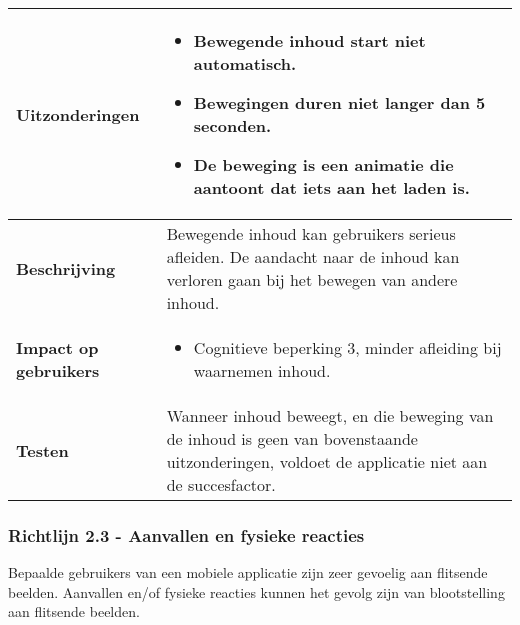 \begin{table}[H]
\begin{tabular}{|l|p{12cm}|}
        \hline
        \textbf{Uitzonderingen}     & 
        \begin{itemize}
            \item Bewegende inhoud start niet automatisch.
            \item Bewegingen duren niet langer dan 5 seconden.
            \item De beweging is een animatie die aantoont dat iets aan het laden is.
        \end{itemize}                                                                                                                                                                                                   \\ 
        \hline
        \textbf{Beschrijving}                 & Bewegende inhoud kan gebruikers serieus afleiden. De aandacht naar de inhoud kan verloren gaan bij het bewegen van andere inhoud. \\ 
        \hline
        \textbf{Impact op gebruikers}         &  
        \begin{itemize}
            \item Cognitieve beperking 3, minder afleiding bij waarnemen inhoud.
        \end{itemize}                                                                                                                                                                                                                                                                                                                                                                                                                    \\ 
        \hline
        \textbf{Testen}                       & Wanneer inhoud beweegt, en die beweging van de inhoud is geen van bovenstaande uitzonderingen, voldoet de applicatie niet aan de succesfactor.                                                                                                                                                                                                                  \\
        \hline
    \end{tabular}
    
\end{table}

\subsubsection{Richtlijn 2.3 - Aanvallen en fysieke reacties}
Bepaalde gebruikers van een mobiele applicatie zijn zeer gevoelig aan flitsende beelden. Aanvallen en/of fysieke reacties kunnen het gevolg zijn van blootstelling aan flitsende beelden. 

